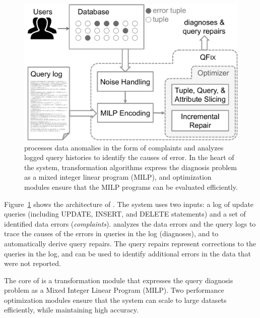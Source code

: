 \begin{figure}[t]
    \centering
        \includegraphics[scale=0.35]{figures/architecture}
    \caption{\sys processes data anomalies in the form of complaints and analyzes logged query histories to identify the causes of error. In the heart of the system, transformation algorithms express the diagnosis problem as a mixed integer linear program (MILP), and optimization modules ensure that the MILP programs can be evaluated efficiently.}
    \label{fig:architecture}
\end{figure}

Figure~\ref{fig:architecture} shows the architecture of \sys. The system uses
two inputs: a log of update queries (including UPDATE, INSERT, and DELETE
statements) and a set of identified data errors (\emph{complaints}). \sys
analyzes the data errors and the query logs to trace the causes of the errors
in queries in the log (diagnoses), and to automatically derive query repairs.
The query repairs represent corrections to the queries in the log, and can be
used to identify additional errors in the data that were not reported.

The core of \sys is a transformation module that expresses the query diagnosis
problem as a Mixed Integer Linear Program (MILP). Two performance optimization modules
ensure that the system can scale to large datasets efficiently, while
maintaining high accuracy. 



